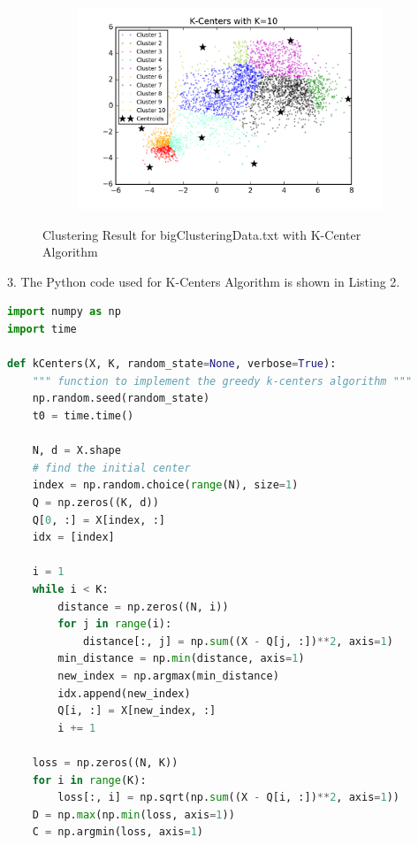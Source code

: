\begin{description}
\begin{description}
\begin{figure}[!h]
\begin{subfigure}[b]{0.475\textwidth}
            \includegraphics[width=\textwidth]{./figures/bigClustering_kCenter_10.png}
        \end{subfigure}
        
        \caption{Clustering Result for bigClusteringData.txt with K-Center Algorithm}
        \label{fig:kcenter_bigClustering}
\end{figure}

\newpage
\item{3.} The Python code used for K-Centers Algorithm is shown in Listing 2.

\begin{lstlisting}[language=Python, caption=K-Centers Algorithm Python Code]
import numpy as np
import time

def kCenters(X, K, random_state=None, verbose=True):
    """ function to implement the greedy k-centers algorithm """
    np.random.seed(random_state)
    t0 = time.time()

    N, d = X.shape
    # find the initial center
    index = np.random.choice(range(N), size=1)
    Q = np.zeros((K, d))
    Q[0, :] = X[index, :]
    idx = [index]

    i = 1
    while i < K:
        distance = np.zeros((N, i))
        for j in range(i):
            distance[:, j] = np.sum((X - Q[j, :])**2, axis=1)
        min_distance = np.min(distance, axis=1)
        new_index = np.argmax(min_distance)
        idx.append(new_index)
        Q[i, :] = X[new_index, :]
        i += 1

    loss = np.zeros((N, K))
    for i in range(K):
        loss[:, i] = np.sqrt(np.sum((X - Q[i, :])**2, axis=1))
    D = np.max(np.min(loss, axis=1))
    C = np.argmin(loss, axis=1)


\end{lstlisting}
\end{description}
\end{description}
